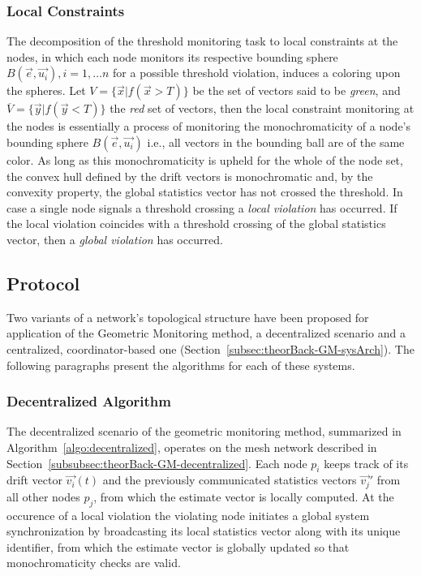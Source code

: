 \subsubsection{Local Constraints} \label{subsubsec:theorBack-GM-localConstraints}

The decomposition of the threshold monitoring task to local constraints at the nodes, in which each node monitors its respective bounding sphere $B(\vec{e}, \vec{u_i}), i=1,\dots n$ for a possible threshold violation, induces a coloring upon the spheres. Let $V=\{\vec{x} | f(\vec{x}>T)\}$ be the set of vectors said to be \emph{green}, and $\overline{V}=\{\vec{y} | f(\vec{y}<T)\}$ the \emph{red} set of vectors, then the local constraint monitoring at the nodes is essentially a process of monitoring the monochromaticity of a node's bounding sphere $B(\vec{e}, \vec{u_i})$ i.e., all vectors in the bounding ball are of the same color. As long as this monochromaticity is upheld for the whole of the node set, the convex hull defined by the drift vectors is monochromatic and, by the convexity property, the global statistics vector has not crossed the threshold. In case a single node signals a threshold crossing a \emph{local violation} has occurred. If the local violation coincides with a threshold crossing of the global statistics vector, then a \emph{global violation} has occurred.

\subsection{Protocol} \label{subsec:theorBack-GM-protocol}

Two variants of a network's topological structure have been proposed for application of the Geometric Monitoring method, a decentralized scenario and a centralized, coordinator-based one (Section~\ref{subsec:theorBack-GM-sysArch}). The following paragraphs present the algorithms for each of these systems.

\subsubsection{Decentralized Algorithm} \label{subsubsec:theorBack-GM-decentralizedAlgo}

The decentralized scenario of the geometric monitoring method, summarized in Algorithm~\ref{algo:decentralized}, operates on the mesh network described in Section~\ref{subsubsec:theorBack-GM-decentralized}. Each node $p_i$ keeps track of its drift vector $\vec{v_i}(t)$ and the previously communicated statistics vectors $\vec{v_j}'$ from all other nodes $p_j$, from which the estimate vector is locally computed. At the occurence of a local violation the violating node initiates a global system synchronization by broadcasting its local statistics vector along with its unique identifier, from which the estimate vector is globally updated so that monochromaticity checks are valid.\\ 

